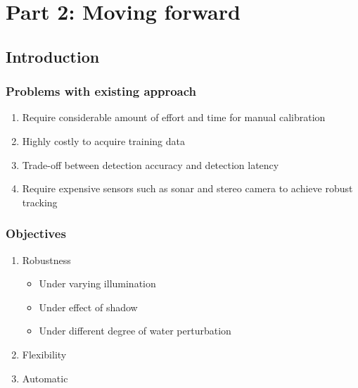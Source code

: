 \chapter{Part 2: Moving forward}

\section{Introduction}

\subsection{Problems with existing approach}
\begin{enumerate}
    \item Require considerable amount of effort and time for manual
    calibration
    \item Highly costly to acquire training data
    \item Trade-off between detection accuracy and detection latency
    \item Require expensive sensors such as sonar and stereo camera to
      achieve robust tracking
\end{enumerate}

\subsection{Objectives}
\begin{enumerate}
    \item Robustness
        \begin{itemize}
            \item Under varying illumination
            \item Under effect of shadow
            \item Under different degree of water perturbation 
        \end{itemize}
    \item Flexibility
    \item Automatic
\end{enumerate}

